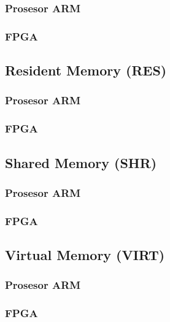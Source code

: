 \subsubsection{Prosesor ARM}
\subsubsection{FPGA}

\subsection{Resident Memory (RES)}
\blindtext
\subsubsection{Prosesor ARM}
\subsubsection{FPGA}

\subsection{Shared Memory (SHR)}
\blindtext
\subsubsection{Prosesor ARM}
\subsubsection{FPGA}

\subsection{Virtual Memory (VIRT)}
\blindtext
\subsubsection{Prosesor ARM}
\subsubsection{FPGA}